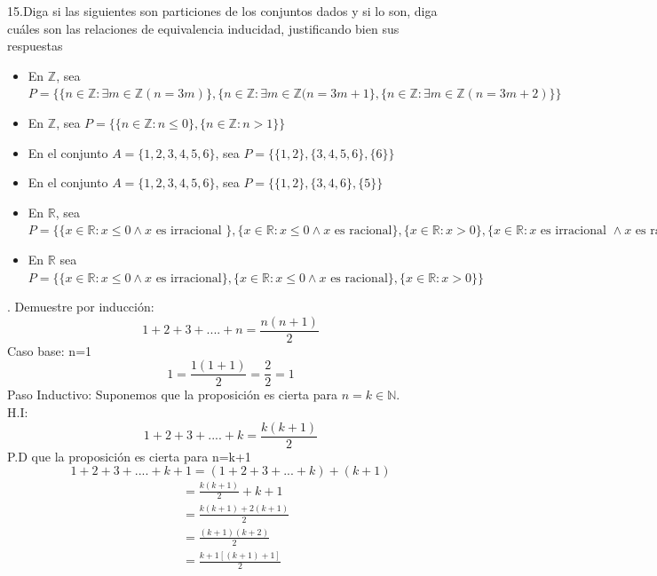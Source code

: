 \documentclass[letterpaper]{article}
\newcommand{\R}{\mathds{R}}
\newcommand{\Z}{\mathds{Z}}
\renewcommand{\*}{\cdot}
\theoremstyle{definition}
\begin{document}
\noindent15.Diga si las siguientes son particiones de los conjuntos dados y si lo son, diga cuáles son las relaciones de equivalencia inducidad, justificando bien sus respuestas
\begin{itemize}
	\item  En $ \Z $, sea $ P = \{ \{ n \in \Z : \exists m \in \Z(n = 3m) \}, \{ n \in \Z : \exists m \in \Z(n = 3m+1 \}, \{ n \in \Z : \exists m \in \Z(n = 3m + 2)  \} \}$
	\item En $  \Z $, sea $ P = \{ \{ n \in \Z :n \leq 0 \}, \{ n \in \Z: n > 1 \} \}  $
	\item En el conjunto $ A= \{1,2,3,4,5,6 \} $, sea $ P = \{ \{ 1,2\},\{3,4,5,6 \},\{6 \} \} $
	\item En el conjunto $ A= \{1,2,3,4,5,6 \} $, sea $ P = \{ \{ 1,2\},\{3,4,6 \},\{5 \} \} $
	\item En $ \R $, sea $ P = \{ \{ x \in \R: x \leq 0 \land x \text{ es irracional } \},\{x \in \R: x \leq 0 \land x \text{ es racional} \},\{x \in \R: x>0 \},\{x \in \R: x \text{ es irracional } \land x \text{ es racional } \}  \} $ 
	\item En $ \R $ sea $ P = \{  \{ x \in \R: x \leq 0 \land x \text{ es irracional} \},\{ x \in \R : x \leq0 \land x \text{ es racional} \},\{ x \in \R: x > 0 \}  \} $
\end{itemize}


. Demuestre por inducción:
$$1+2+3+....+ n = \frac{n(n+1)}{2}$$
Caso base: n=1
$$1 = \frac{1(1+1)}{2} = \frac{2}{2} = 1$$
Paso Inductivo: Suponemos que la proposición es cierta para $n=k \in \mathbb{N}.$\\
H.I:
$$1+2+3+....+ k = \frac{k(k+1)}{2}$$
P.D que la proposición es cierta para n=k+1
$$1+2+3+....+ k + 1 = (1+2+3+...+k) + (k+1)$$
\begin{align*}
	&=\frac{k(k+1)}{2}+k+1\\
	&=\frac{k(k+1)+2(k+1)}{2}\\
	&=\frac{(k+1)(k+2)}{2}\\
	&=\frac{k+1[(k+1)+1]}{2}
\end{align*}
\end{document}
